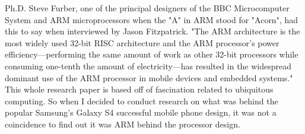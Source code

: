 \documentclass[12pt]{scrreprt}
\begin{document}
	Ph.D. Steve Furber, one of the principal designers of the BBC Microcomputer System and ARM microprocessors when the "A" in ARM stood for 
	"Acorn", had this to say when interviewed by Jason Fitzpatrick. "The ARM architecture is the most widely used 32-bit RISC architecture and the ARM processor's power efficiency—performing the same amount of work as other 32-bit processors while consuming one-tenth the amount of electricity—has resulted in the widespread dominant use of the ARM processor in mobile devices and embedded systems." This whole research paper is based off of fascination related to ubiquitous computing. So when I decided to conduct research on what was behind the popular Samsung's Galaxy S4 successful mobile phone design, it was not a coincidence to find out it was ARM behind the processor design.
\end{document}
